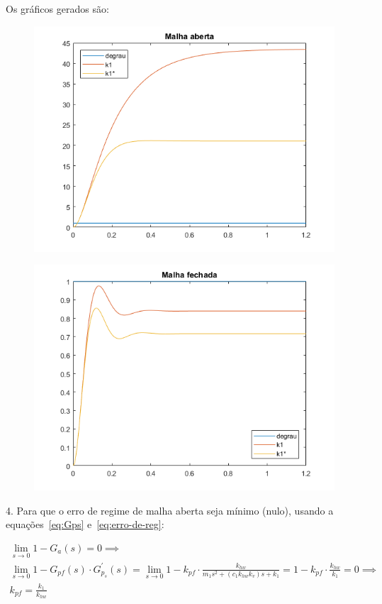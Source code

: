 \documentclass[a4paper,11pt]{article}
\begin{document}
Os gráficos gerados são:

\begin{figure}[H]
\includegraphics{exp01e03f-aberta}
\centering
\end{figure}

\begin{figure}[H]
\includegraphics{exp01e03f-fechada}
\centering
\end{figure}

4. Para que o erro de regime de malha aberta seja mínimo (nulo), usando a
equações~\ref{eq:Gps} e~\ref{eq:erro-de-reg}:

\begin{gather*}
    \lim_{s\to0} 1 - G_a\left(s\right) = 0 \implies \\
    \lim_{s\to0} 1 - G_{pf}\left(s\right) \cdot
        G^\prime_{p_s}\left(s\right) =
        \lim_{s\to0} 1 - k_{pf} \cdot
        \frac{k_{hw}}{m_1s^2 + \left( c_1 k_{hw} k_v \right) s + k_1} =
        1 - k_{pf} \cdot \frac{k_{hw}}{k_1} = 0 \implies \\
    k_{pf} = \frac{k_1}{k_{hw}}
\end{gather*}
\end{document}
